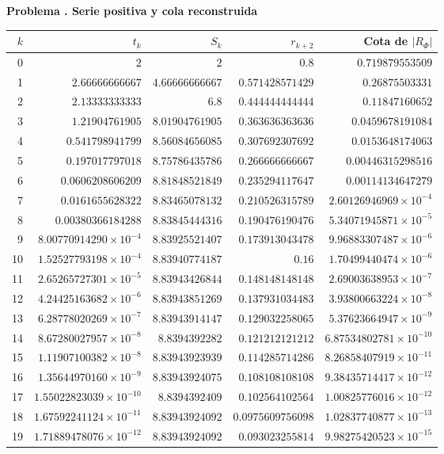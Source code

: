\documentclass[11pt,a4paper]{article}
\theoremstyle{definition}
\newcounter{problema}
\newenvironment{resuelto}[1]{\refstepcounter{problema}\par\medskip\Needspace{6\baselineskip}\textbf{Problema \theproblema. #1}\par}{\par\medskip}
\begin{document}
\begin{resuelto}{Serie positiva y cola reconstruida}
\begin{center}\small\begin{tabular}{rrrrr}
\toprule
$k$&$t_k$&$S_k$&$r_{k+2}$&Cota de $|R_\Phi|$\\
\midrule
0&$2$&$2$&$0.8$&$0.719879553509$\\
1&$2.66666666667$&$4.66666666667$&$0.571428571429$&$0.26875503331$\\
2&$2.13333333333$&$6.8$&$0.444444444444$&$0.11847160652$\\
3&$1.21904761905$&$8.01904761905$&$0.363636363636$&$0.0459678191084$\\
4&$0.541798941799$&$8.56084656085$&$0.307692307692$&$0.0153648174063$\\
5&$0.197017797018$&$8.75786435786$&$0.266666666667$&$0.00446315298516$\\
6&$0.0606208606209$&$8.81848521849$&$0.235294117647$&$0.00114134647279$\\
7&$0.0161655628322$&$8.83465078132$&$0.210526315789$&$2.60126946969\times10^{-4}$\\
8&$0.00380366184288$&$8.83845444316$&$0.190476190476$&$5.34071945871\times10^{-5}$\\
9&$8.00770914290\times10^{-4}$&$8.83925521407$&$0.173913043478$&$9.96883307487\times10^{-6}$\\
10&$1.52527793198\times10^{-4}$&$8.83940774187$&$0.16$&$1.70499440474\times10^{-6}$\\
11&$2.65265727301\times10^{-5}$&$8.83943426844$&$0.148148148148$&$2.69003638953\times10^{-7}$\\
12&$4.24425163682\times10^{-6}$&$8.83943851269$&$0.137931034483$&$3.93800663224\times10^{-8}$\\
13&$6.28778020269\times10^{-7}$&$8.83943914147$&$0.129032258065$&$5.37623664947\times10^{-9}$\\
14&$8.67280027957\times10^{-8}$&$8.8394392282$&$0.121212121212$&$6.87534802781\times10^{-10}$\\
15&$1.11907100382\times10^{-8}$&$8.83943923939$&$0.114285714286$&$8.26858407919\times10^{-11}$\\
16&$1.35644970160\times10^{-9}$&$8.83943924075$&$0.108108108108$&$9.38435714417\times10^{-12}$\\
17&$1.55022823039\times10^{-10}$&$8.8394392409$&$0.102564102564$&$1.00825776016\times10^{-12}$\\
18&$1.67592241124\times10^{-11}$&$8.83943924092$&$0.0975609756098$&$1.02837740877\times10^{-13}$\\
19&$1.71889478076\times10^{-12}$&$8.83943924092$&$0.093023255814$&$9.98275420523\times10^{-15}$\\

\end{tabular}
\end{center}
\end{resuelto}
\end{document}

